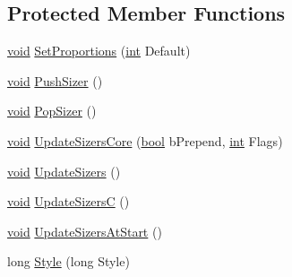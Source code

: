 \subsection*{Protected Member Functions}
\begin{DoxyCompactItemize}
\item 
\hyperlink{sound_8c_ae35f5844602719cf66324f4de2a658b3}{void} \hyperlink{class_shuttle_gui_base_af3e784d0e46f462a639a5a8549af2302}{Set\+Proportions} (\hyperlink{xmltok_8h_a5a0d4a5641ce434f1d23533f2b2e6653}{int} Default)
\item 
\hyperlink{sound_8c_ae35f5844602719cf66324f4de2a658b3}{void} \hyperlink{class_shuttle_gui_base_ab89757827776bb3daf334caa44c1d107}{Push\+Sizer} ()
\item 
\hyperlink{sound_8c_ae35f5844602719cf66324f4de2a658b3}{void} \hyperlink{class_shuttle_gui_base_a39c8af2adaf2945d140f0eac576e9231}{Pop\+Sizer} ()
\item 
\hyperlink{sound_8c_ae35f5844602719cf66324f4de2a658b3}{void} \hyperlink{class_shuttle_gui_base_aa75c98722e4bc3701f37117ca507dbe9}{Update\+Sizers\+Core} (\hyperlink{mac_2config_2i386_2lib-src_2libsoxr_2soxr-config_8h_abb452686968e48b67397da5f97445f5b}{bool} b\+Prepend, \hyperlink{xmltok_8h_a5a0d4a5641ce434f1d23533f2b2e6653}{int} Flags)
\item 
\hyperlink{sound_8c_ae35f5844602719cf66324f4de2a658b3}{void} \hyperlink{class_shuttle_gui_base_a172b0dd8b7547ed60679430d550af811}{Update\+Sizers} ()
\item 
\hyperlink{sound_8c_ae35f5844602719cf66324f4de2a658b3}{void} \hyperlink{class_shuttle_gui_base_a4e64f5af26a696cd8f69bf9c2126c3d4}{Update\+SizersC} ()
\item 
\hyperlink{sound_8c_ae35f5844602719cf66324f4de2a658b3}{void} \hyperlink{class_shuttle_gui_base_a4eba653c930158856f76bf08815391f7}{Update\+Sizers\+At\+Start} ()
\item 
long \hyperlink{class_shuttle_gui_base_a0cddabfbde5119c7e8a9a785c9bf8e84}{Style} (long Style)
\end{DoxyCompactItemize}
